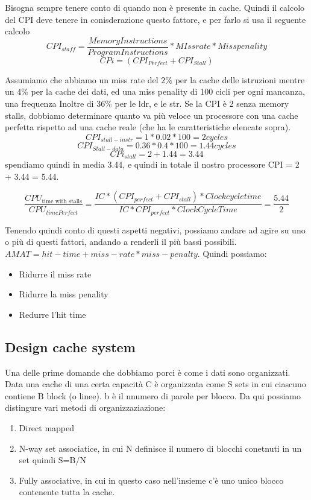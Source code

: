 Bisogna sempre tenere conto di quando non è presente in cache. Quindi il calcolo del CPI deve tenere in conisderazione questo fattore, e per farlo si usa il seguente calcolo
\[CPI_{staff} = \frac{Memory Instructions}{Program Instructions} * MIss rate * Miss penality\]
\[CPi = (CPI_{Perfect} + CPI_{Stall})\]

\begin{example}
    Assumiamo che abbiamo un miss rate del \(2\%\) per la cache delle istruzioni mentre un \(4\%\) per la cache dei dati, ed una miss penality di 100 cicli per ogni mancanza, una frequenza Inoltre
    di \(36\%\) per le ldr, e le str. Se la CPI è 2 senza memory stalls, dobbiamo determinare quanto va più veloce un processore con una cache perfetta rispetto ad una cache reale (che ha le caratteristiche elencate sopra).\\

    \[CPI_{stall-instr} = 1 * 0.02 * 100 = 2 cycles\]
    \[CPI_{Stall-data} = 0.36 * 0.4 * 100 = 1.44 cycles\]
    \[CPi_{stall} = 2 + 1.44 = 3.44\]
    spendiamo quindi in media 3.44, e quindi in totale il nostro processore CPI = 2 + 3.44 = 5.44.

    \[\frac{CPU_{\text{time with stalls}}}{CPU_{time Perfect}} = \frac{IC * (CPI_{perfect} + CPI_{stall}) * Clockcycletime}{IC * CPI_{perfect} * ClockCycleTime} =  \frac{5.44}{2}\]
\end{example}

Tenendo quindi conto di questi aspetti negativi, possiamo andare ad agire su uno o più di questi fattori, andando a renderli il più bassi possibili.
\(AMAT = hit-time + miss-rate * miss-penalty\). Quindi possiamo:
\begin{itemize}
    \item Ridurre il miss rate
    \item Ridurre la miss penality
    \item Redurre l'hit time
\end{itemize}

\subsection{Design cache system}
Una delle prime domande che dobbiamo porci è come i dati sono organizzati.\\
Data una cache di una certa capacità C è organizzata come S sets in cui ciascuno contiene B block (o linee). b è il nnumero di parole per blocco.
Da qui possiamo distingure vari metodi di organizzaziazione:
\begin{enumerate}
    \item Direct mapped
    \item N-way set associatice, in cui N definisce il numero di blocchi conetnuti in un set quindi S=B/N
    \item Fully associative, in cui in questo caso nell'insieme c'è uno unico blocco contenente tutta la cache.
\end{enumerate}

